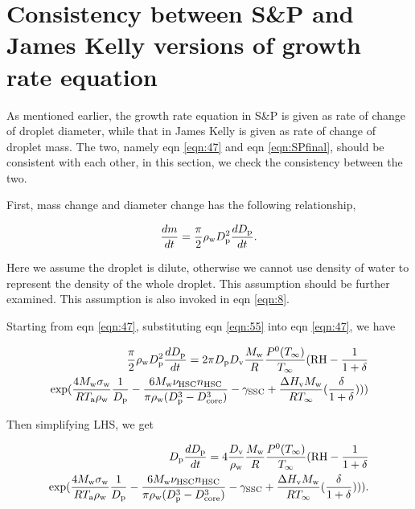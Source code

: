 \documentclass[12pt]{article}
\begin{document}
\section{Consistency between S\&P and James Kelly versions of growth rate equation}

As mentioned earlier,  the growth rate equation in S\&P is given as rate of change of droplet diameter, while that in James Kelly is given as rate of change of droplet mass.  The two, namely eqn \ref{eqn:47} and eqn \ref{eqn:SPfinal}, should be consistent with each other, in this section, we check the consistency between the two.

First, mass change and diameter change has the following relationship,

\begin{equation}\label{eqn:55}
\frac{dm}{dt}=\frac{\pi}{2}\rho_{\rm w}D_{\rm p}^{2}\frac{dD_{\rm p}}{dt}.
\end{equation}

Here we assume the droplet is dilute, otherwise we cannot use density of water to represent the density of the whole droplet.
This assumption should be further examined. This assumption is also invoked in eqn \ref{eqn:8}.

Starting from eqn \ref{eqn:47}, substituting eqn \ref{eqn:55} into eqn \ref{eqn:47},  we have 

\begin{eqnarray}\label{eqn:56}
\frac{\pi}{2}\rho_{\rm w}D_{\rm p}^{2}\frac{dD_{\rm p}}{dt}=2 \pi D_{\rm p} D_{\rm v}  \frac{M_{\rm w}}{R} \frac{P^{\rm 0}(T_{\infty})} {T_{\infty}} (\textrm{RH} - \frac{1}{1+\delta}  \\ \nonumber
\exp( \frac{4 M_{\rm w}\sigma_{\rm w}}{R T_{\rm a} \rho_{\rm w}}\frac{1}{D_{\rm p}}-\frac{6M_{\rm w}\nu_{\rm HSC}n_{\rm HSC}}{\pi \rho_{\rm w}(D_{\rm p}^{3}-D_{\rm core}^{3})}-\gamma_{\rm SSC}+\frac{\Delta H_{\rm v} M_{\rm w}}{R T_{\infty}} (\frac{\delta}{1+\delta})))  \nonumber
\end{eqnarray}

Then simplifying LHS, we get 

\begin{eqnarray}\label{eqn:57}
D_{\rm p}\frac{dD_{\rm p}}{dt}=4 \frac{D_{\rm v}}{\rho_{\rm w}}  \frac{M_{\rm w}}{R} \frac{P^{\rm 0}(T_{\infty})} {T_{\infty}} (\textrm{RH} - \frac{1}{1+\delta}  \\ \nonumber
\exp( \frac{4 M_{\rm w}\sigma_{\rm w}}{R T_{\rm a} \rho_{\rm w}}\frac{1}{D_{\rm p}}-\frac{6M_{\rm w}\nu_{\rm HSC}n_{\rm HSC}}{\pi \rho_{\rm w}(D_{\rm p}^{3}-D_{\rm core}^{3})}-\gamma_{\rm SSC}+\frac{\Delta H_{\rm v} M_{\rm w}}{R T_{\infty}} (\frac{\delta}{1+\delta}))).  \nonumber
\end{eqnarray}
\end{document}
